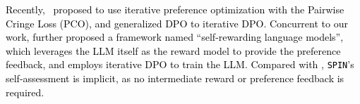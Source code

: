 \documentclass{article}
\newcommand{\method}{\texttt{SPIN}}
\def\CC{\textcolor{black}}
\def\CCC{\textcolor{red}}
\begin{document}
\CC{Recently,~\citet{xu2023some} proposed to use iterative preference optimization with the Pairwise Cringe Loss (PCO), and generalized DPO to iterative DPO. Concurrent to our work, \citet{yuan2024self} further proposed a framework named ``self-rewarding language models'', which leverages the LLM itself as the reward model to provide the preference feedback, and employs iterative DPO to train the LLM.}
\CC{
Compared with \citet{xu2023some, yuan2024self}, \method{}'s self-assessment is implicit, as no intermediate reward or preference feedback is required. 
}




\end{document}
